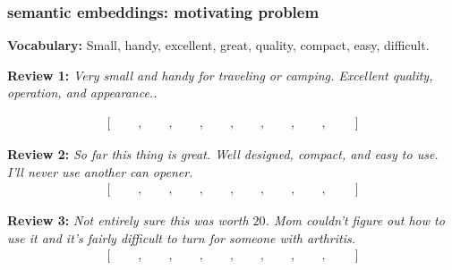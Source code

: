 \documentclass[handout,compress]{beamer}
\begin{document}
\begin{frame}
		\frametitle{semantic embeddings: motivating problem}
		\small
		\textbf{Vocabulary:} Small, handy, excellent, great, quality, compact, easy, difficult.
		
		\textbf{Review 1:} \textit{Very small and handy for traveling or camping. Excellent quality, operation, and appearance..}
		
		\begin{align*}
		\left[\hspace{2em},\hspace{2em},\hspace{2em},\hspace{2em},\hspace{2em},\hspace{2em},\hspace{2em},\hspace{2em}\right]
		\end{align*}
		
		\textbf{Review 2:} \textit{So far this thing is great. Well designed, compact, and easy to use. I’ll never use another can opener.} 
		\begin{align*}
		\left[\hspace{2em},\hspace{2em},\hspace{2em},\hspace{2em},\hspace{2em},\hspace{2em},\hspace{2em},\hspace{2em}\right]
		\end{align*}
		
		\textbf{Review 3:} \textit{Not entirely sure this was worth $20$. Mom couldn't figure out how to use it and it's fairly difficult to turn for someone with arthritis.}
				\begin{align*}
		\left[\hspace{2em},\hspace{2em},\hspace{2em},\hspace{2em},\hspace{2em},\hspace{2em},\hspace{2em},\hspace{2em}\right]
		\end{align*}
\end{frame}
\end{document}

